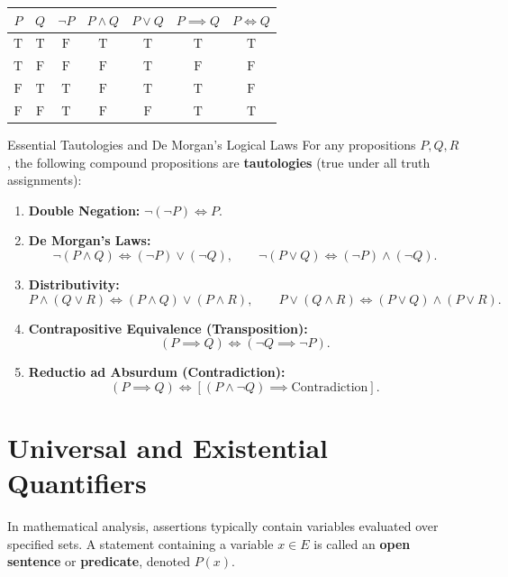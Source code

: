 \begin{center}
\renewcommand{\arraystretch}{1.25}
\begin{tabular}{ccccccc}
\toprule
$P$ & $Q$ & $\neg P$ & $P \land Q$ & $P \lor Q$ & $P \implies Q$ & $P \iff Q$ \\
\midrule
$\mathrm{T}$ & $\mathrm{T}$ & $\mathrm{F}$ & $\mathrm{T}$ & $\mathrm{T}$ & $\mathrm{T}$ & $\mathrm{T}$ \\
$\mathrm{T}$ & $\mathrm{F}$ & $\mathrm{F}$ & $\mathrm{F}$ & $\mathrm{T}$ & $\mathrm{F}$ & $\mathrm{F}$ \\
$\mathrm{F}$ & $\mathrm{T}$ & $\mathrm{T}$ & $\mathrm{F}$ & $\mathrm{T}$ & $\mathrm{T}$ & $\mathrm{F}$ \\
$\mathrm{F}$ & $\mathrm{F}$ & $\mathrm{T}$ & $\mathrm{F}$ & $\mathrm{F}$ & $\mathrm{T}$ & $\mathrm{T}$ \\
\bottomrule
\end{tabular}
\end{center}

\begin{propbox}{Essential Tautologies and De Morgan's Logical Laws}
For any propositions $P, Q, R$, the following compound propositions are \textbf{tautologies} (true under all truth assignments):
\begin{enumerate}[leftmargin=1.4em,itemsep=2pt]
  \item \textbf{Double Negation:} $\neg(\neg P) \iff P$.
  \item \textbf{De Morgan's Laws:}
  \[
  \neg(P \land Q) \iff (\neg P) \lor (\neg Q), \qquad \neg(P \lor Q) \iff (\neg P) \land (\neg Q).
  \]
  \item \textbf{Distributivity:}
  \[
  P \land (Q \lor R) \iff (P \land Q) \lor (P \land R), \qquad P \lor (Q \land R) \iff (P \lor Q) \land (P \lor R).
  \]
  \item \textbf{Contrapositive Equivalence (Transposition):}
  \[
  (P \implies Q) \iff (\neg Q \implies \neg P).
  \]
  \item \textbf{Reductio ad Absurdum (Contradiction):}
  \[
  (P \implies Q) \iff \left[ (P \land \neg Q) \implies \text{Contradiction} \right].
  \]
\end{enumerate}
\end{propbox}

\section{Universal and Existential Quantifiers}

In mathematical analysis, assertions typically contain variables evaluated over specified sets. A statement containing a variable $x \in E$ is called an \textbf{open sentence} or \textbf{predicate}, denoted $P(x)$.

